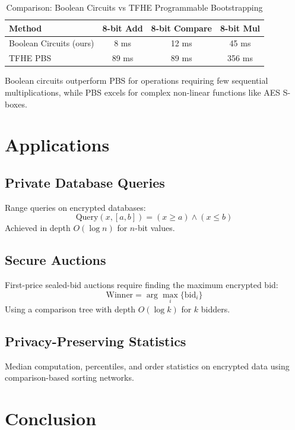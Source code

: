\documentclass[11pt,a4paper]{article}
\begin{document}
\begin{table}[h]
\centering
\caption{Comparison: Boolean Circuits vs TFHE Programmable Bootstrapping}
\begin{tabular}{@{}lccc@{}}
\toprule
Method & 8-bit Add & 8-bit Compare & 8-bit Mul \\
\midrule
Boolean Circuits (ours) & 8 ms & 12 ms & 45 ms \\
TFHE PBS & 89 ms & 89 ms & 356 ms \\
\bottomrule
\end{tabular}
\end{table}

Boolean circuits outperform PBS for operations requiring few sequential multiplications, while PBS excels for complex non-linear functions like AES S-boxes.

\section{Applications}

\subsection{Private Database Queries}

Range queries on encrypted databases:
\begin{equation}
\text{Query}(x, [a, b]) = (x \geq a) \land (x \leq b)
\end{equation}
Achieved in depth $O(\log n)$ for $n$-bit values.

\subsection{Secure Auctions}

First-price sealed-bid auctions require finding the maximum encrypted bid:
\begin{equation}
\text{Winner} = \arg\max_i \{\text{bid}_i\}
\end{equation}
Using a comparison tree with depth $O(\log k)$ for $k$ bidders.

\subsection{Privacy-Preserving Statistics}

Median computation, percentiles, and order statistics on encrypted data using comparison-based sorting networks.

\section{Conclusion}
\end{document}
